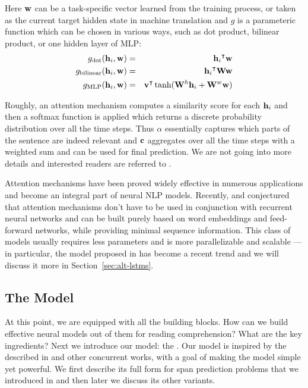 Here $\mathbf{w}$ can be a task-specific vector learned from the training process, or taken as the current target hidden state in machine translation and $g$ is a parameteric function which can be chosen in various ways, such as dot product, bilinear product, or one hidden layer of MLP:
\begin{eqnarray}
    g_{\text{dot}}(\mathbf{h}_i, \mathbf{w}) &=& {\mathbf{h}_i}^{\intercal}\mathbf{w} \\
    g_{\text{bilinear}}(\mathbf{h}_i, \mathbf{w}) &=& {\mathbf{h}_i}^\intercal\mathbf{W}\mathbf{w} \\
    g_{\text{MLP}}(\mathbf{h}_i, \mathbf{w}) &=& {\mathbf{v}}^\intercal\tanh(\mathbf{W}^h\mathbf{h}_i + \mathbf{W}^w\mathbf{w}) \label{eq:mlp-att}
\end{eqnarray}

Roughly, an attention mechanism computes a similarity score for each $\mathbf{h}_i$ and then a softmax function is applied which returns a discrete probability distribution over all the time steps. Thus $\alpha$ essentially captures which parts of the sentence are indeed relevant and $\mathbf{c}$ aggregates over all the time steps with a weighted sum and can be used for final prediction. We are not going into more details and interested readers are referred to .

Attention mechanisms have been proved widely effective in numerous applications and become an integral part of neural NLP models. Recently,  and  conjectured that attention mechanisms don't have to be used in conjunction with recurrent neural networks and can be built purely based on word embeddings and feed-forward networks, while providing minimal sequence information. This class of models usually requires less parameters and is more parallelizable and scalable --- in particular, the  model proposed in  has become a recent trend and we will discuss it more in Section~\ref{sec:alt-lstms}.

\subsection{The Model}
At this point, we are equipped with all the building blocks. How can we build effective neural models out of them for reading comprehension? What are the key ingredients? Next we introduce our model: the . Our model is inspired by the  described in  and other concurrent works, with a goal of making the model simple yet powerful. We first describe its full form for span prediction problems that we introduced in  and then later we discuss its other variants.

